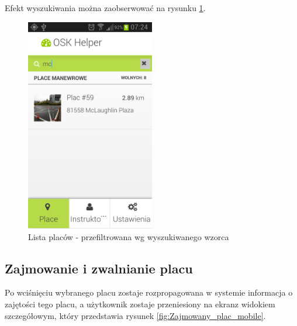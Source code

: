 \documentclass[twoside,a4paper,openright,12pt]{book}
\begin{document}
Efekt wyszukiwania można zaobserwować na rysunku \ref{fig:Lista_placow-przefiltrowana_mobile}.

\begin{figure}[H]
\centering
\includegraphics[width=0.5\textwidth]{screenshots/android/wyszukiwanie.png}
\caption{Lista placów - przefiltrowana wg wyszukiwanego wzorca}
\label{fig:Lista_placow-przefiltrowana_mobile}
\end{figure}


\subsection{Zajmowanie i zwalnianie placu}

Po wciśnięciu wybranego placu zostaje rozpropagowana w systemie informacja o zajętości tego placu, a użytkownik zostaje przeniesiony na ekranz  widokiem szczegółowym, który przedstawia rysunek \ref{fig:Zajmowany_plac_mobile}.
\end{document}
